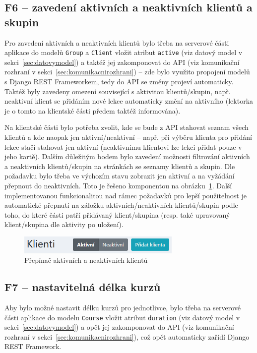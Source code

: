 \subsection{F6 -- zavedení aktivních a neaktivních klientů a skupin}

Pro zavedení aktivních a neaktivních klientů bylo třeba na serverové části aplikace do modelů \verb|Group| a \verb|Client| vložit atribut \verb|active| (viz datový model v sekci~\ref{sec:datovymodel}) a taktéž jej zakomponovat do API (viz komunikační rozhraní v sekci~\ref{sec:komunikacnirozhrani}) -- zde bylo využito propojení modelů s Django REST Frameworkem, tedy do API se změny projeví automaticky. Taktéž byly zavedeny omezení související s aktivitou klientů/skupin, např. neaktivní klient se přidáním nové lekce automaticky změní na aktivního (lektorka je o tomto na klientské části předem taktéž informována).

Na klientské části bylo potřeba zvolit, kde se bude z API stahovat seznam všech klientů a kde naopak jen aktivní/neaktivní -- např. při výběru klienta pro přidání lekce stačí stahovat jen aktivní (neaktivnímu klientovi lze lekci přidat pouze v jeho kartě). Dalším důležitým bodem bylo zavedení možnosti filtrování aktivních a neaktivních klientů/skupin na stránkách se seznamy klientů a skupin. Dle požadavku bylo třeba ve výchozím stavu zobrazit jen aktivní a na vyžádání přepnout do neaktivních. Toto je řešeno komponentou na obrázku~\ref{fig:ui-screen-prepinac-aktivity}. Další implementovanou funkcionalitou nad rámec požadavků pro lepší použitelnost je automatické přepnutí na záložku aktivních/neaktivních klientů/skupin podle toho, do které části patří přidávaný klient/skupina (resp. také upravovaný klient/skupina dle aktivity po uložení).

\begin{figure}[h]\centering
    \includegraphics[width=0.7\textwidth]{img/ui-screen-prepinac-aktivity.png}
    \caption{Přepínač aktivních a neaktivních klientů}\label{fig:ui-screen-prepinac-aktivity}
\end{figure}

\subsection{F7 -- nastavitelná délka kurzů}

Aby bylo možné nastavit délku kurzů pro jednotlivce, bylo třeba na serverové části aplikace do modelu \verb|Course| vložit atribut \verb|duration| (viz datový model v sekci~\ref{sec:datovymodel}) a opět jej zakomponovat do API (viz komunikační rozhraní v sekci~\ref{sec:komunikacnirozhrani}), což opět automaticky zařídí Django REST Framework.

